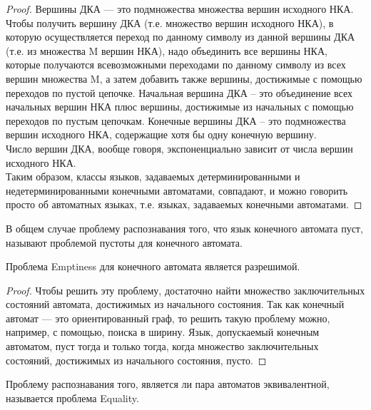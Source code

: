     \begin{proof}
        Вершины ДКА --- это подмножества множества вершин исходного НКА. Чтобы получить вершину ДКА (т.е. множество вершин исходного НКА), в которую осуществляется переход по данному символу из данной вершины ДКА (т.е. из множества M вершин НКА), надо объединить все вершины НКА, которые получаются всевозможными переходами по данному символу из всех вершин множества M, а затем добавить также вершины, достижимые с помощью переходов по пустой цепочке. Начальная вершина ДКА -- это объединение всех начальных вершин НКА плюс вершины, достижимые из начальных с помощью переходов по пустым цепочкам. Конечные вершины ДКА -- это подмножества вершин исходного НКА, содержащие хотя бы одну конечную вершину.\\
        Число вершин ДКА, вообще говоря, экспоненциально зависит от числа вершин исходного НКА.\\
        Таким образом, классы языков, задаваемых детерминированными и недетерминированными конечными автоматами, совпадают, и можно говорить просто об автоматных языках, т.е. языках, задаваемых конечными автоматами.
    \end{proof} 

    
    \begin{Def}
         В общем случае проблему распознавания того, что язык конечного автомата пуст, называют проблемой пустоты для конечного автомата. 
    \end{Def}
    
    \begin{Thm}
        Проблема Emptiness для конечного автомата является разрешимой.
    \end{Thm}
    
    \begin{proof}
        Чтобы решить эту проблему, достаточно найти множество заключительных состояний автомата, достижимых из начального состояния. Так как конечный автомат — это ориентированный граф, то решить такую проблему можно, например, с помощью, поиска в ширину. Язык, допускаемый конечным автоматом, пуст тогда и только тогда, когда множество заключительных состояний, достижимых из начального состояния, пусто.
    \end{proof}

    \begin{Def}
        Проблему распознавания того, является ли пара автоматов эквивалентной, называется проблема Equality.
    \end{Def}
    
